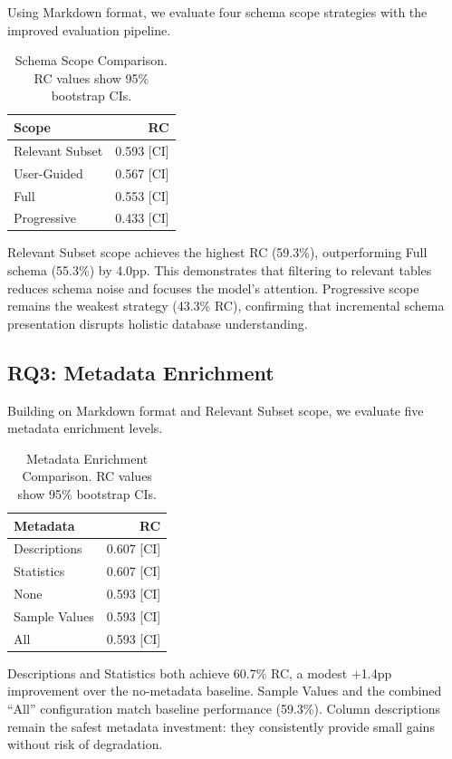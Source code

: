 \documentclass[sigconf, nonacm]{acmart}
\begin{document}
Using Markdown format, we evaluate four schema scope strategies with the improved evaluation pipeline.

\begin{table}[t]
\caption{Schema Scope Comparison. RC values show 95\% bootstrap CIs.}
\label{tab:scope}
\centering
\small
\begin{tabular}{lr}
\toprule
\textbf{Scope} & \textbf{RC} \\
\midrule
Relevant Subset & 0.593 [CI] \\
User-Guided & 0.567 [CI] \\
Full & 0.553 [CI] \\
Progressive & 0.433 [CI] \\
\bottomrule
\end{tabular}
\end{table}

Relevant Subset scope achieves the highest RC (59.3\%), outperforming Full schema (55.3\%) by 4.0pp. This demonstrates that filtering to relevant tables reduces schema noise and focuses the model's attention. Progressive scope remains the weakest strategy (43.3\% RC), confirming that incremental schema presentation disrupts holistic database understanding.

\subsection{RQ3: Metadata Enrichment}

Building on Markdown format and Relevant Subset scope, we evaluate five metadata enrichment levels.

\begin{table}[t]
\caption{Metadata Enrichment Comparison. RC values show 95\% bootstrap CIs.}
\label{tab:metadata}
\centering
\small
\begin{tabular}{lr}
\toprule
\textbf{Metadata} & \textbf{RC} \\
\midrule
Descriptions & 0.607 [CI] \\
Statistics & 0.607 [CI] \\
None & 0.593 [CI] \\
Sample Values & 0.593 [CI] \\
All & 0.593 [CI] \\
\bottomrule
\end{tabular}
\end{table}

Descriptions and Statistics both achieve 60.7\% RC, a modest +1.4pp improvement over the no-metadata baseline. Sample Values and the combined ``All'' configuration match baseline performance (59.3\%). Column descriptions remain the safest metadata investment: they consistently provide small gains without risk of degradation.
\end{document}
